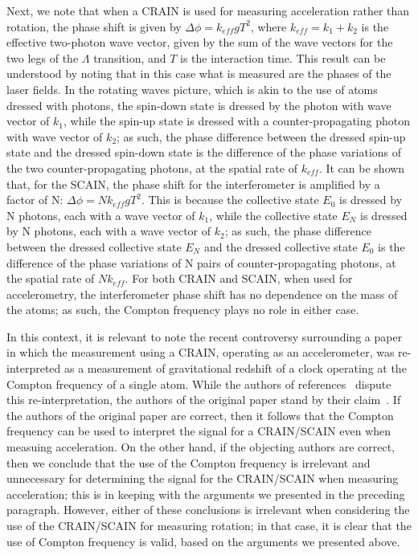 \documentclass[aps,pra,letterpaper,superscriptaddress,showpacs,amsmath,floats,twocolumn]{revtex4-1}
\begin{document}
Next, we note that when a CRAIN is used for measuring acceleration rather than rotation, the phase shift is given by $\Delta \phi=k_{eff}gT^2$, where $k_{eff}=k_{1}+k_{2}$ is the effective two-photon wave vector, given by the sum of the wave vectors for the two legs of the $\Lambda$ transition, and $T$ is the interaction time. This result can be understood by noting that in this case what is measured are the phases of the laser fields. In the rotating waves picture, which is akin to the use of atoms dressed with photons, the spin-down state is dressed by the photon with wave vector of $k_{1}$, while the spin-up state is dressed with a counter-propagating photon with wave vector of $k_{2}$; as such, the phase difference between the dressed spin-up state and the dressed spin-down state is the difference of the phase variations of the two counter-propagating photons, at the spatial rate of $k_{eff}$. It can be shown that, for the SCAIN, the phase shift for the interferometer is amplified by a factor of N: $\Delta \phi=N k_{eff}gT^2$. This is because the collective state $E_{0}$ is dressed by N photons, each with a wave vector of $k_{1}$, while the collective state $E_{N}$ is dressed by N photons, each with a wave vector of $k_{2}$; as such, the phase difference between the dressed collective state $E_{N}$ and the dressed collective state $E_{0}$ is the difference of the phase variations of N pairs of counter-propagating photons, at the spatial rate of $Nk_{eff}$. For both CRAIN and SCAIN, when used for accelerometry, the interferometer phase shift has no dependence on the mass of the atoms; as such, the Compton frequency plays no role in either case.

In this context, it is relevant to note the recent controversy surrounding a paper~\cite{Muller} in which the measurement using a CRAIN, operating as an accelerometer, was re-interpreted as a measurement of gravitational redshift of a clock operating at the Compton frequency of a single atom. While the authors of references~\cite{Wolf,Wolf1,Schleich,Schleich1} dispute this re-interpretation, the authors of the original paper stand by their claim~\cite{Muller1}. If the authors of the original paper are correct, then it follows that the Compton frequency can be used to interpret the signal for a CRAIN/SCAIN even when measuing acceleration. On the other hand, if the objecting authors are correct, then we conclude that the use of the Compton frequency is irrelevant and unnecessary for determining the signal for the CRAIN/SCAIN when measuring acceleration; this is in keeping with the arguments we presented in the preceding paragraph. However, either of these conclusions is irrelevant when considering the use of the CRAIN/SCAIN for measuring rotation; in that case, it is clear that the use of Compton frequency is valid, based on the arguments we presented above. 
\end{document}
